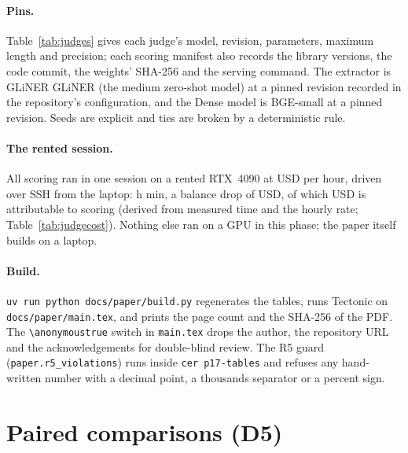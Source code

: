 \paragraph{Pins.} Table~\ref{tab:judges} gives each judge's model, revision, parameters, maximum
length and precision; each scoring manifest also records the library versions, the code commit,
the weights' SHA-256 and the serving command. The extractor is GLiNER
GLiNER (the medium zero-shot model) at a pinned revision recorded in the repository's
configuration, and the Dense model is BGE-small at a pinned revision. Seeds are explicit and ties are broken by a deterministic rule.

\paragraph{The rented session.} All scoring ran in one session on a rented RTX~4090 at
\judgeRateLight{} USD per hour, driven over SSH from the laptop: \sessionHours{} h \sessionMinutes{} min, a balance
drop of \usdSession{} USD, of which \usdGpuAttributable{} USD is attributable to scoring (derived from
measured time and the hourly rate; Table~\ref{tab:judgecost}). Nothing else ran on a GPU in this
phase; the paper itself builds on a laptop.

\paragraph{Build.} \texttt{uv run python docs/paper/build.py} regenerates the tables, runs Tectonic
on \texttt{docs/paper/main.tex}, and prints the page count and the SHA-256 of the PDF. The
\texttt{\textbackslash anonymoustrue} switch in \texttt{main.tex} drops the author, the repository
URL and the acknowledgements for double-blind review. The R5 guard
(\texttt{paper.r5\_violations}) runs inside \texttt{cer p17-tables} and refuses any hand-written
number with a decimal point, a thousands separator or a percent sign.

\section{Paired comparisons (D5)}
\label{app:d5}

\begin{table}[t]
\centering
\scriptsize
\caption{\capDFiveHotpotqa}

\end{table}

\begin{table}[t]
\centering
\scriptsize
\caption{\capDFiveMusique}

\end{table}

